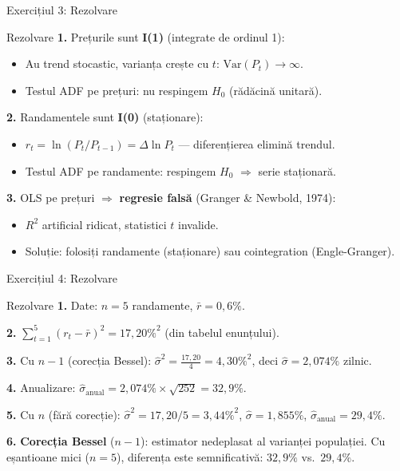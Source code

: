 \documentclass[9pt, aspectratio=169, t]{beamer}
\theoremstyle{definition}
\begin{document}
\begin{frame}{Exercițiul 3: Rezolvare}
\begin{block}{Rezolvare}
\textbf{1.} Prețurile sunt \textbf{I(1)} (integrate de ordinul 1):
\begin{itemize}
\item Au trend stocastic, varianța crește cu $t$: $\text{Var}(P_t) \to \infty$.
\item Testul ADF pe prețuri: nu respingem $H_0$ (rădăcină unitară).
\end{itemize}

\textbf{2.} Randamentele sunt \textbf{I(0)} (staționare):
\begin{itemize}
\item $r_t = \ln(P_t/P_{t-1}) = \Delta\ln P_t$ — diferențierea elimină trendul.
\item Testul ADF pe randamente: respingem $H_0$ $\Rightarrow$ serie staționară.
\end{itemize}

\textbf{3.} OLS pe prețuri $\Rightarrow$ \textbf{regresie falsă} (Granger \& Newbold, 1974):
\begin{itemize}
\item $R^2$ artificial ridicat, statistici $t$ invalide.
\item Soluție: folosiți randamente (staționare) sau cointegration (Engle-Granger).
\end{itemize}
\end{block}
\end{frame}

\begin{frame}{Exercițiul 4: Rezolvare}
\begin{block}{Rezolvare}
\textbf{1.} Date: $n = 5$ randamente, $\bar{r} = 0{,}6\%$.

\textbf{2.} $\sum_{t=1}^{5}(r_t - \bar{r})^2 = 17{,}20\%^2$ (din tabelul enunțului).

\textbf{3.} Cu $n-1$ (corecția Bessel): $\hat{\sigma}^2 = \frac{17{,}20}{4} = 4{,}30\%^2$, deci $\hat{\sigma} = 2{,}074\%$ zilnic.

\textbf{4.} Anualizare: $\hat{\sigma}_{\text{anual}} = 2{,}074\% \times \sqrt{252} = 32{,}9\%$.

\textbf{5.} Cu $n$ (fără corecție): $\hat{\sigma}^2 = 17{,}20/5 = 3{,}44\%^2$, $\hat{\sigma} = 1{,}855\%$, $\hat{\sigma}_{\text{anual}} = 29{,}4\%$.

\textbf{6.} \textbf{Corecția Bessel} ($n-1$): estimator nedeplasat al varianței populației. Cu eșantioane mici ($n = 5$), diferența este semnificativă: $32{,}9\%$ vs.\ $29{,}4\%$.
\end{block}
\end{frame}
\end{document}
